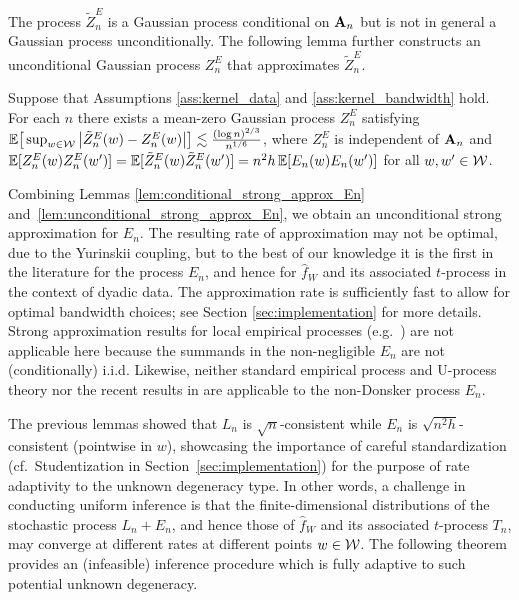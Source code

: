The process $\tilde Z_n^E$ is a Gaussian process conditional on $\mathbf{A}_n$ but is
not in general a Gaussian process unconditionally. The following lemma further
constructs an unconditional Gaussian process $Z_n^E$ that approximates
$\tilde Z_n^E$.

\begin{lemma}
  \label{lem:unconditional_strong_approx_En}

  Suppose that Assumptions \ref{ass:kernel_data} and
  \ref{ass:kernel_bandwidth} hold. For each $n$ there exists
  a mean-zero Gaussian process $Z^E_n$ satisfying
  $\mathbb{E}\big[ \sup_{w \in \mathcal{W}} \big|\tilde Z_n^E(w) - Z_n^E(w)\big| \big]
  \lesssim \frac{(\log n)^{2/3}}{n^{1/6}}$,
  where $Z_n^E$ is independent of $\mathbf{A}_n$ and
  $\mathbb{E}[Z_n^E(w)Z_n^E(w')]=\mathbb{E}[\tilde Z_n^E(w)\tilde Z_n^E(w')]
  = n^2h \, \mathbb{E}[E_n(w)E_n(w')]$ for all $w, w' \in \mathcal{W}$.
\end{lemma}

Combining Lemmas \ref{lem:conditional_strong_approx_En}
and~\ref{lem:unconditional_strong_approx_En}, we obtain an unconditional strong
approximation for $E_n$. The resulting rate of approximation may not be
optimal, due to the Yurinskii coupling, but to the best of our knowledge it is
the first in the literature for the process $E_n$, and hence for $\hat{f}_W$
and its associated $t$-process in the context of dyadic data. The approximation
rate is sufficiently fast to allow for optimal bandwidth choices; see Section
\ref{sec:implementation} for more details. Strong approximation results for
local empirical processes (e.g.\ \citealp{gine2010confidence}) are not
applicable here because the summands in the non-negligible $E_n$ are not
(conditionally) i.i.d. Likewise, neither standard empirical process and
U-process theory \citep{van1996weak,gine2021mathematical} nor the recent
results in \citet{davezies2021exchangeable} are applicable to the non-Donsker
process $E_n$.

The previous lemmas showed that $L_n$ is $\sqrt{n}$-consistent while $E_n$ is
$\sqrt{n^2h}$-consistent (pointwise in $w$), showcasing the importance of
careful standardization (cf.\ Studentization in
Section~\ref{sec:implementation}) for the purpose of rate adaptivity to the
unknown degeneracy type. In other words, a challenge in conducting uniform
inference is that the finite-dimensional distributions of the stochastic
process $L_n+E_n$, and hence those of $\hat{f}_W$ and its associated
$t$-process $T_n$, may converge at different rates at different points
$w\in\mathcal{W}$. The following theorem provides an (infeasible) inference procedure
which is fully adaptive to such potential unknown degeneracy.

